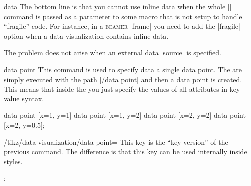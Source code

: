 \begin{datavisualizationoperation}{data}{}
    The bottom line is that you cannot use inline data when the whole
    |\datavisualization| command is passed as a parameter to some macro that is
    not setup to handle ``fragile'' code. For instance, in a \textsc{beamer}
    |frame| you need to add the |fragile| option when a data visualization
    contains inline data.

    The problem does not arise when an external data |source| is specified.
\end{datavisualizationoperation}

\begin{datavisualizationoperation}{data point}{}
    This command is used to specify data a single data point. The
     are simply executed with the path |/data point| and then a
    data point is created. This means that inside the  you just
    specify the values of all attributes in key--value syntax.
\begin{codeexample}[preamble={\usetikzlibrary{datavisualization}}]
\tikz {}
  data point [x=1, y=1]    data point [x=1, y=2]
  data point [x=2, y=2]    data point [x=2, y=0.5];
\end{codeexample}
\end{datavisualizationoperation}

\begin{key}{/tikz/data visualization/data point=}
    This key is the ``key version'' of the previous command. The difference is
    that this key can be used internally inside styles.
\begin{codeexample}[preamble={\usetikzlibrary{datavisualization}}]
\tikz \datavisualization
[ school book axes, visualize as line,
  horizontal=1,
  horizontal=2 ];
\end{codeexample}
\end{key}

